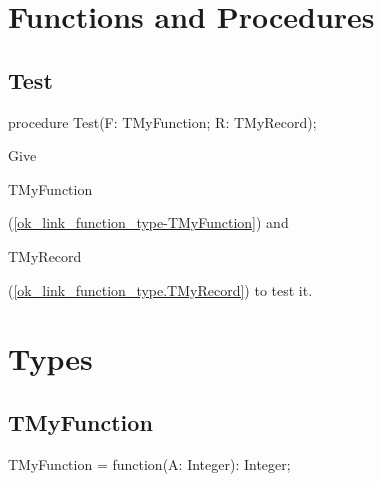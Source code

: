 \documentclass{report}
\begin{document}
\section{Functions and Procedures}
\subsection*{Test}
\begin{list}{}{
\setlength{\itemindent}{0cm}
\setlength{\listparindent}{0cm}
\setlength{\leftmargin}{\evensidemargin}
\addtolength{\leftmargin}{\tmplength}
\settowidth{\labelsep}{X}
\addtolength{\leftmargin}{\labelsep}
\setlength{\labelwidth}{\tmplength}
}
\begin{flushleft}
\item[\textbf{Declaration}\hfill]
\begin{ttfamily}
procedure Test(F: TMyFunction; R: TMyRecord);\end{ttfamily}


\end{flushleft}
\par
\item[\textbf{Description}]
Give \begin{ttfamily}TMyFunction\end{ttfamily}(\ref{ok_link_function_type-TMyFunction}) and \begin{ttfamily}TMyRecord\end{ttfamily}(\ref{ok_link_function_type.TMyRecord}) to test it.

\end{list}
\section{Types}
\subsection*{TMyFunction}
\begin{list}{}{
\setlength{\itemindent}{0cm}
\setlength{\listparindent}{0cm}
\setlength{\leftmargin}{\evensidemargin}
\addtolength{\leftmargin}{\tmplength}
\settowidth{\labelsep}{X}
\addtolength{\leftmargin}{\labelsep}
\setlength{\labelwidth}{\tmplength}
}
\begin{flushleft}
\item[\textbf{Declaration}\hfill]
\begin{ttfamily}
TMyFunction = function(A: Integer): Integer;\end{ttfamily}


\end{flushleft}
\end{list}
\end{document}
